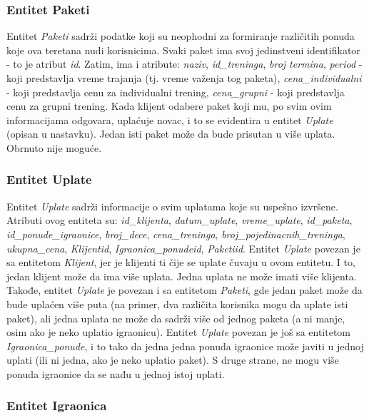 \documentclass[../main.tex]{subfiles}
\begin{document}
\subsubsection{Entitet Paketi}
Entitet \textit{Paketi} sadrži podatke koji su neophodni za formiranje različitih ponuda koje ova teretana nudi korisnicima. Svaki paket ima svoj jedinstveni identifikator - to je atribut \textit{id}. Zatim, ima i atribute: \textit{naziv}, \textit{id\_treninga}, \textit{broj termina}, \textit{period} - koji predstavlja vreme trajanja (tj. vreme važenja tog paketa), \textit{cena\_individualni} - koji predstavlja cenu za individualni trening, \textit{cena\_grupni} - koji predstavlja cenu za grupni trening. Kada klijent odabere paket koji mu, po svim ovim informacijama odgovara, uplaćuje novac, i to se evidentira u entitet \textit{Uplate} (opisan u nastavku). Jedan isti paket može da bude prisutan u više uplata. Obrnuto nije moguće.


\subsubsection{Entitet Uplate}

Entitet \textit{Uplate} sadrži informacije o svim uplatama koje su uspešno izvršene. Atributi ovog entiteta su:  \textit{id\_klijenta}, \textit{datum\_uplate}, \textit{vreme\_uplate}, \textit{id\_paketa}, \textit{id\_ponude\_igraonice}, \textit{broj\_dece}, \textit{cena\_treninga}, \textit{broj\_pojedinacnih\_treninga}, \textit{ukupna\_cena}, \textit{Klijentid}, \textit{Igraonica\_ponudeid}, \textit{Paketiid}.
Entitet \textit{Uplate} povezan je sa entitetom \textit{Klijent}, jer je klijenti ti čije se uplate čuvaju u ovom entitetu. I to, jedan klijent može da ima više uplata. Jedna uplata ne može imati više klijenta. Takođe, entitet \textit{Uplate} je povezan i sa entitetom \textit{Paketi}, gde jedan paket može da bude uplaćen više puta (na primer, dva različita korisnika mogu da uplate isti paket), ali jedna uplata ne može da sadrži više od jednog paketa (a ni manje, osim ako je neko uplatio igraonicu). Entitet \textit{Uplate} povezan je još sa entitetom \textit{Igraonica\_ponude}, i to tako da jedna jedna ponuda igraonice može javiti u jednoj uplati (ili ni jedna, ako je neko uplatio paket). S druge strane, ne mogu više ponuda igraonice da se nađu u jednoj istoj uplati.


\subsubsection{Entitet Igraonica}
\end{document}
